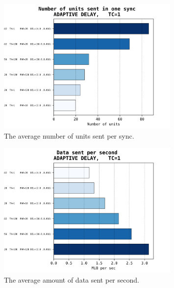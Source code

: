 \documentclass[a4paper,10pt]{article}
\begin{document}
			\begin{figure}[h]
				\centering
				\includegraphics[width=0.8\textwidth]{bar_plots/big/units_sent_sync.png}
				\caption{The average number of units sent per sync.}
				\label{fig:bigUnitsPerSync}
			\end{figure}
			\begin{figure}[h]
				\centering
				\includegraphics[width=0.8\textwidth]{bar_plots/big/bytes_sent_per_sec.png}
				\caption{The average amount of data sent per second.}
				\label{fig:bigBps}
			\end{figure}
\end{document}
